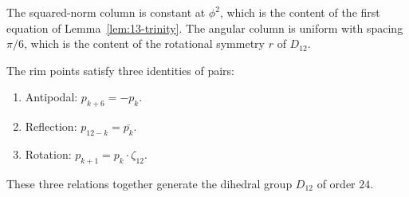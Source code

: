 \begin{center}
\end{center}

The squared-norm column is constant at $\phi^{2}$, which is the
content of the first equation of Lemma~\ref{lem:13-trinity}. The
angular column is uniform with spacing $\pi/6$, which is the
content of the rotational symmetry $r$ of $D_{12}$.

The rim points satisfy three identities of pairs:

\begin{enumerate}
\item Antipodal: $p_{k+6} = -p_{k}$.
\item Reflection: $p_{12-k} = \overline{p_{k}}$.
\item Rotation: $p_{k+1} = p_{k} \cdot \zeta_{12}$.
\end{enumerate}

These three relations together generate the dihedral group $D_{12}$
of order $24$.

